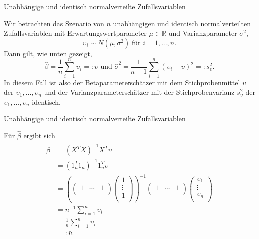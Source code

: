 \documentclass[
  8pt,
  ignorenonframetext,
]{beamer}
\begin{document}
\begin{frame}{Unabhängige und identisch normalverteilte
Zufallsvariablen}
\protect\hypertarget{unabhuxe4ngige-und-identisch-normalverteilte-zufallsvariablen}{}
\small

Wir betrachten das Szenario von \(n\) unabhängigen und identisch
normalverteilten Zufallsvariablen mit Erwartungswertparameter
\(\mu \in \mathbb{R}\) und Varianzparameter \(\sigma^2\),
\begin{equation}
\upsilon_i \sim N(\mu,\sigma^2) \mbox{ für } i = 1,...,n.
\end{equation} Dann gilt, wie unten gezeigt,
\begin{equation}\label{eq:iid_estimators}
\hat{\beta} = \frac{1}{n}\sum_{i=1}^n \upsilon_i =: \bar{\upsilon}
\mbox{ und }
\hat{\sigma}^2 = \frac{1}{n-1}\sum_{i=1}^n (\upsilon_i - \bar{\upsilon})^2 =: s^2_\upsilon.
\end{equation} In diesem Fall ist also der Betaparameterschätzer mit dem
Stichprobenmittel \(\bar{\upsilon}\) der \(\upsilon_1,...,\upsilon_n\)
und der Varianzparameterschätzer mit der Stichprobenvarianz
\(s_\upsilon^2\) der \(\upsilon_1,...,\upsilon_n\) identisch.
\end{frame}

\begin{frame}{Unabhängige und identisch normalverteilte
Zufallsvariablen}
\protect\hypertarget{unabhuxe4ngige-und-identisch-normalverteilte-zufallsvariablen-1}{}
\small

Für \(\hat{\beta}\) ergibt sich \begin{align*}
\begin{split}
\hat{\beta}
& = (X^TX)^{-1}X^T\upsilon
\\
& = \left(1_n^T 1_n\right)^{-1}1_n^T\upsilon
\\
& =
\left(
\begin{pmatrix}
1 & \cdots & 1\\
\end{pmatrix}
\begin{pmatrix}
1\\
\vdots \\
1\\
\end{pmatrix}
\right)^{-1}
\begin{pmatrix}
1 & \cdots & 1\\
\end{pmatrix}
\begin{pmatrix}
\upsilon_{1}\\
\vdots \\
\upsilon_{n}\\
\end{pmatrix}
\\
& = n^{-1}\sum_{i=1}^n \upsilon_i
\\
& =\frac{1}{n}\sum_{i=1}^n \upsilon_i
\\
& =: \bar{\upsilon}.
\end{split}
\end{align*}
\end{frame}
\end{document}
